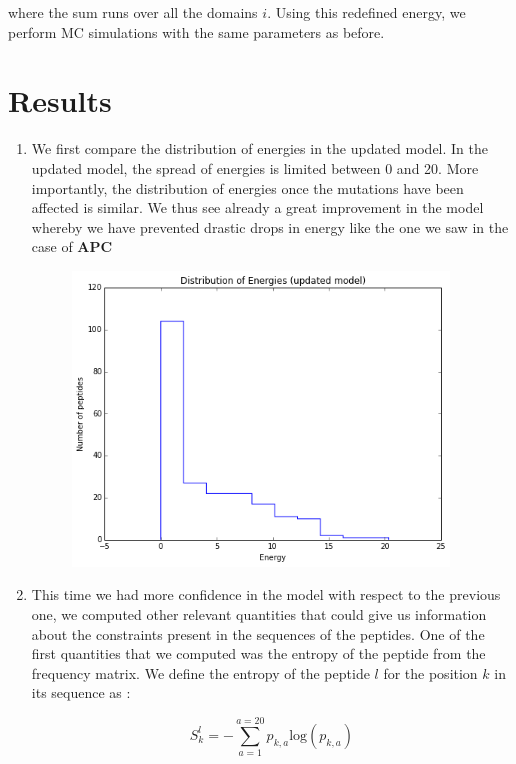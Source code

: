 \documentclass[a4paper, 12pt]{article}
\begin{document}
where the sum runs over all the domains $i$. Using this redefined energy, we perform MC simulations with the same parameters as before.

\section{Results}

\begin{enumerate}
\item 
We first compare the distribution of energies in the updated model. In the updated model, the spread of energies is limited between 0 and 20. More importantly, the distribution of energies once the mutations have been affected is similar. We thus see already a great improvement in the model whereby we have prevented drastic drops in energy like the one we saw in the case of \textbf{APC} 

\begin{figure}[!h]
\label{update_model_energy}
\centering
\includegraphics[width=10cm]{Images/update_model_dist.png}
\end{figure}

\item 

This time we had more confidence in the model with respect to the previous one, we computed other relevant quantities that could give us information about the constraints present in the sequences of the peptides. One of the first quantities that we computed was the entropy of the peptide from the frequency matrix. We define the entropy of the peptide $l$ for the position $k$ in its sequence as :

\begin{equation}
\label{entropy_definition}
S^{l}_{k} = -\sum_{a=1}^{a=20} p_{k,a} \mathrm{log}(p_{k,a})
\end{equation}


\end{enumerate}
\end{document}
